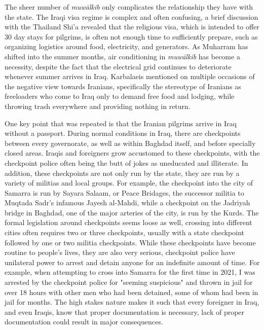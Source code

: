 The sheer number of \emph{muwālkib} only complicates the relationship they have with the state. The Iraqi visa regime is complex and often confusing, a brief discussion with the Thailand Shi'a revealed that the religious visa, which is intended to offer 30 day stays for pilgrims, is often not enough time to sufficiently prepare, such as organizing logistics around food, electricity, and generators. As Muharram has shifted into the summer months, air conditioning in \emph{muwālkib} has become a necessity, despite the fact that the electrical grid continues to deteriorate whenever summer arrives in Iraq. Karbalaeis mentioned on multiple occasions of the negative view towards Iranians, specifically the stereotype of Iranians as freeloaders who come to Iraq only to demand free food and lodging, while throwing trash everywhere and providing nothing in return. 

One key point that was repeated is that the Iranian pilgrims arrive in Iraq without a passport. During normal conditions in Iraq, there are checkpoints between every governorate, as well as within Baghdad itself, and before specially closed areas. Iraqis and foreigners grow accustomed to these checkpoints, with the checkpoint police often being the butt of jokes as uneducated and illiterate. In addition, these checkpoints are not only run by the state, they are run by a variety of militias and local groups. For example, the checkpoint into the city of Samarra is run by Sayara Salaam, or Peace Bridages, the successor militia to Muqtada Sadr's infamous Jayesh al-Mahdi, while a checkpoint on the Jadriyah bridge in Baghdad, one of the major arteries of the city, is run by the Kurds. The formal legislation around checkpoints seems loose as well, crossing into different cities often requires two or three checkpoints, usually with a state checkpoint followed by one or two militia checkpoints. While these checkpoints have become routine to people's lives, they are also very serious, checkpoint police have unilateral power to arrest and detain anyone for an indefinite amount of time. For example, when attempting to cross into Samarra for the first time in 2021, I was arrested by the checkpoint police for "seeming suspicious" and thrown in jail for over 18 hours with other men who had been detained, some of whom had been in jail for months. The high stakes nature makes it such that every foreigner in Iraq, and even Iraqis, know that proper documentation is necessary, lack of proper documentation could result in major consequences. 

